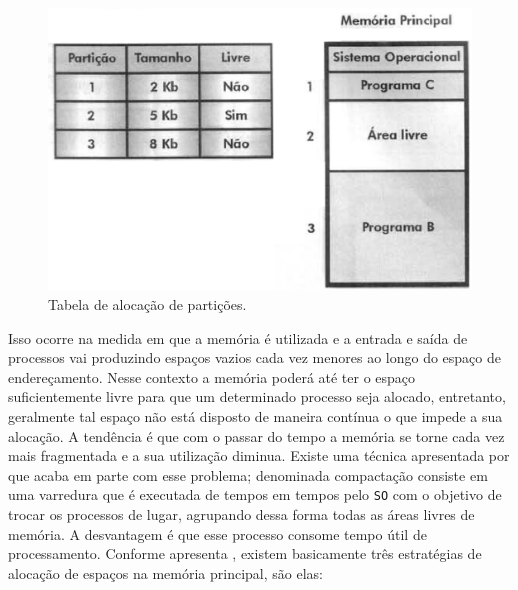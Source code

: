 \begin{figure}[h]
	\centering
	\caption{\label{particao}Tabela de alocação de partições.}
		\includegraphics[keepaspectratio=true,scale=0.5]{figuras/particao.eps}
\end{figure}

Isso ocorre na medida em que a memória é utilizada e a entrada e saída de processos vai produzindo espaços vazios cada vez menores ao longo do espaço de endereçamento. Nesse contexto a memória poderá até ter o espaço suficientemente livre para que um determinado processo seja alocado, entretanto, geralmente tal espaço não está disposto de maneira contínua o que impede a sua alocação. A tendência é que com o passar do tempo a memória se torne cada vez mais fragmentada e a sua utilização diminua. Existe uma técnica apresentada por \cite{stail} que acaba em parte com esse problema; denominada compactação consiste em uma varredura que é executada de tempos em tempos pelo \texttt{SO} com o objetivo de trocar os processos de lugar, agrupando dessa forma todas as áreas livres de memória. A desvantagem é que esse processo consome tempo útil de processamento. 
Conforme apresenta \cite{machadomaia}, existem basicamente três estratégias de alocação de espaços na memória principal, são elas:

